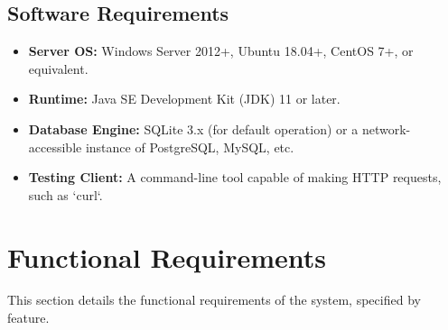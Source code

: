 \documentclass[12pt, a4paper]{report}
\begin{document}
\subsection{Software Requirements}
\begin{itemize}
    \item \textbf{Server OS:} Windows Server 2012+, Ubuntu 18.04+, CentOS 7+, or equivalent.
    \item \textbf{Runtime:} Java SE Development Kit (JDK) 11 or later.
    \item \textbf{Database Engine:} SQLite 3.x (for default operation) or a network-accessible instance of PostgreSQL, MySQL, etc.
    \item \textbf{Testing Client:} A command-line tool capable of making HTTP requests, such as `curl`.
\end{itemize}

\section{Functional Requirements}
This section details the functional requirements of the system, specified by feature.
\end{document}
